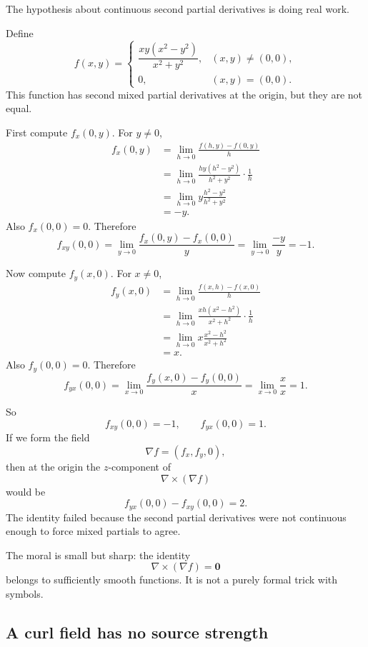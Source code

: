 The hypothesis about continuous second partial derivatives is doing real work.

\begin{example}
Define
\[
    f(x,y)=
    \begin{cases}
    \dfrac{xy(x^2-y^2)}{x^2+y^2}, & (x,y)\ne(0,0),\\[2mm]
    0, & (x,y)=(0,0).
    \end{cases}
\]
This function has second mixed partial derivatives at the origin, but they are not equal.

First compute \(f_x(0,y)\).  For \(y\ne0\),
\[
\begin{aligned}
f_x(0,y)
&=
\lim_{h\to0}
\frac{f(h,y)-f(0,y)}{h}\\
&=
\lim_{h\to0}
\frac{hy(h^2-y^2)}{h^2+y^2}\cdot\frac1h\\
&=
\lim_{h\to0}
y\frac{h^2-y^2}{h^2+y^2}\\
&=
-y.
\end{aligned}
\]
Also \(f_x(0,0)=0\).  Therefore
\[
    f_{xy}(0,0)
    =
    \lim_{y\to0}\frac{f_x(0,y)-f_x(0,0)}{y}
    =
    \lim_{y\to0}\frac{-y}{y}
    =
    -1.
\]

Now compute \(f_y(x,0)\).  For \(x\ne0\),
\[
\begin{aligned}
f_y(x,0)
&=
\lim_{h\to0}
\frac{f(x,h)-f(x,0)}{h}\\
&=
\lim_{h\to0}
\frac{xh(x^2-h^2)}{x^2+h^2}\cdot\frac1h\\
&=
\lim_{h\to0}
x\frac{x^2-h^2}{x^2+h^2}\\
&=
x.
\end{aligned}
\]
Also \(f_y(0,0)=0\).  Therefore
\[
    f_{yx}(0,0)
    =
    \lim_{x\to0}\frac{f_y(x,0)-f_y(0,0)}{x}
    =
    \lim_{x\to0}\frac{x}{x}
    =
    1.
\]

So
\[
\boxed{
    f_{xy}(0,0)=-1,
    \qquad
    f_{yx}(0,0)=1.
}
\]
If we form the field
\[
    \nabla f=(f_x,f_y,0),
\]
then at the origin the \(z\)-component of
\[
    \nabla\times(\nabla f)
\]
would be
\[
    f_{yx}(0,0)-f_{xy}(0,0)=2.
\]
The identity failed because the second partial derivatives were not continuous enough
to force mixed partials to agree.
\end{example}

The moral is small but sharp: the identity
\[
    \nabla\times(\nabla f)=\mathbf 0
\]
belongs to sufficiently smooth functions.  It is not a purely formal trick with symbols.

\subsection{A curl field has no source strength}

